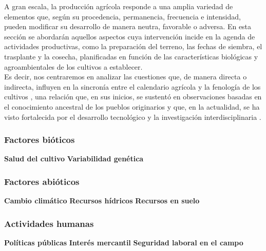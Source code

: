 A gran escala, la producción agrícola responde a una amplia variedad de elementos que, según su procedencia, permanencia, frecuencia e intensidad, pueden modificar su desarrollo de manera neutra, favorable o adversa. En esta sección se abordarán aquellos aspectos cuya intervención incide en la agenda de actividades productivas, como la preparación del terreno, las fechas de siembra, el trasplante y la cosecha, planificadas en función de las características biológicas y agroambientales de los cultivos a establecer.\\

Es decir, nos centraremos en analizar las cuestiones que, de manera directa o indirecta, influyen en la sincronía entre el calendario agrícola y la fenología de los cultivos \cite{DGSIAP, Dimou_2018, Franch_2022}, una relación que, en sus inicios, se sustentó en observaciones basadas en el conocimiento ancestral de los pueblos originarios \cite{Omran_2020, Vazquez-Cercas_2023} y que, en la actualidad, se ha visto fortalecida por el desarrollo tecnológico y la investigación interdisciplinaria \cite{Islam_2025, Jeba_2024, Kumudini_2014, Minoli_2022}.



\subsubsection{Factores bióticos}

\textbf{Salud del cultivo}
\textbf{Variabilidad genética}
\subsubsection{Factores abióticos}
\textbf{Cambio climático}
\textbf{Recursos hídricos}
\textbf{Recursos en suelo}

\subsubsection{Actividades humanas}
\textbf{Políticas públicas}
\textbf{Interés mercantil}
\textbf{Seguridad laboral en el campo}
